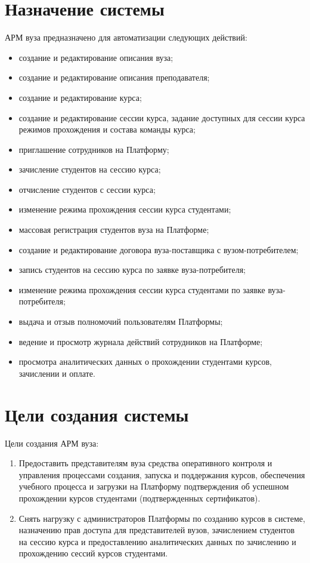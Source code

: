 \section{Назначение системы}
АРМ вуза предназначено для автоматизации следующих действий:

\begin{itemize}
	\item создание и редактирование описания вуза;
	\item создание и редактирование описания преподавателя;
	\item создание и редактирование курса;
	\item создание и редактирование сессии курса, задание доступных для сессии курса режимов прохождения 
	и состава команды курса;
	\item приглашение сотрудников на Платформу;
	\item зачисление студентов на сессию курса;
	\item отчисление студентов с сессии курса;
	\item изменение режима прохождения сессии курса студентами;
	\item массовая регистрация студентов вуза на Платформе;
	\item создание и редактирование договора вуза-поставщика с вузом-потребителем;
	\item запись студентов на сессию курса по заявке вуза-потребителя;
	\item изменение режима прохождения сессии курса студентами по заявке вуза-потребителя;
	\item выдача и отзыв полномочий пользователям Платформы;
	\item ведение и просмотр журнала действий сотрудников на Платформе;
	\item просмотра аналитических данных о прохождении студентами курсов, зачислении и оплате.
\end{itemize}


\section{Цели создания системы}
Цели создания АРМ вуза:
\begin{enumerate}
	\item Предоставить представителям вуза средства оперативного контроля и управления процессами создания, 
	запуска и поддержания курсов, обеспечения учебного процесса и загрузки на Платформу подтверждения об успешном
	прохождении курсов студентами (подтвержденных сертификатов).
	\item Снять нагрузку с администраторов Платформы по созданию курсов в системе, назначению прав доступа 
	для представителей вузов, зачислением студентов на сессию курса и предоставлению аналитических данных по зачислению
	и прохождению сессий курсов студентами.
\end{enumerate}